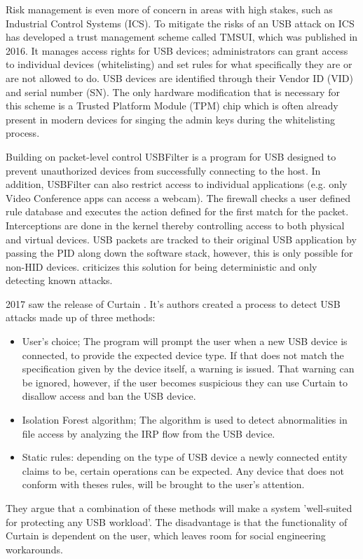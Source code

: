 Risk management is even more of concern in areas with high stakes, such as Industrial Control Systems (ICS). To mitigate the risks of an USB attack on ICS \cite{yangTMSUITrustManagement2016} has developed a trust management scheme called TMSUI, which was published in 2016. It manages access rights for USB devices; administrators can grant access to individual devices (whitelisting) and set rules for what specifically they are or are not allowed to do. USB devices are identified through their Vendor ID (VID) and serial number (SN). The only hardware modification that is necessary for this scheme is a Trusted Platform Module (TPM) chip which is often already present in modern devices for singing the admin keys during the whitelisting process.

Building on packet-level control USBFilter \cite{tianMakingUSBGreat2016} is a program for USB designed to prevent unauthorized devices from successfully connecting to the host. In addition, USBFilter can also restrict access to individual applications (e.g. only Video Conference apps can access a webcam). The firewall checks a user defined rule database and executes the action defined for the first match for the packet. Interceptions are done in the kernel thereby controlling access to both physical and virtual devices. USB packets are tracked to their original USB application by passing the PID along down the software stack, however, this is only possible for non-HID devices.
\cite{nissimUSBbasedAttacks2017} criticizes this solution for being deterministic and only detecting known attacks. 

2017 saw the release of Curtain \cite{fuCurtainKeepYour2017}. It's authors created a process to detect USB attacks made up of three methods:
\begin{itemize}
    \item User's choice; The program will prompt the user when a new USB device is connected, to provide the expected device type. If that does not match the specification given by the device itself, a warning is issued. That warning can be ignored, however, if the user becomes suspicious they can use Curtain to disallow access and ban the USB device.
    \item Isolation Forest algorithm; The algorithm is used to detect abnormalities in file access by analyzing the IRP flow from the USB device. 
    \item Static rules: depending on the type of USB device a newly connected entity claims to be, certain operations can be expected. Any device that does not conform with theses rules, will be brought to the user's attention. 
\end{itemize}
They argue that a combination of these methods will make a system 'well-suited for protecting any USB workload'.  The disadvantage is that the functionality of Curtain is dependent on the user, which leaves room for social engineering workarounds.  

